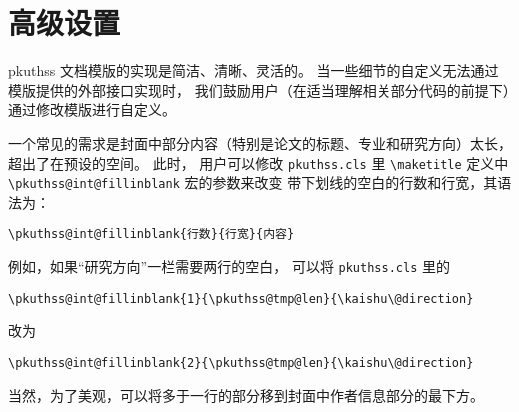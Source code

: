 	\section{高级设置}\label{sec:advanced}

	pkuthss 文档模版的实现是简洁、清晰、灵活的。
	当一些细节的自定义无法通过模版提供的外部接口实现时，
	我们鼓励用户（在适当理解相关部分代码的前提下）通过修改模版进行自定义。

	一个常见的需求是封面中部分内容（特别是论文的标题、专业和研究方向）太长，
	超出了在预设的空间。
	此时，
	用户可以修改 \verb|pkuthss.cls| 里 \verb|\maketitle| 定义中
	\verb|\pkuthss@int@fillinblank| 宏的参数来改变
	带下划线的空白的行数和行宽，其语法为：
\begin{Verbatim}[frame = single]
\pkuthss@int@fillinblank{行数}{行宽}{内容}
\end{Verbatim}
	例如，如果“研究方向”一栏需要两行的空白，
	可以将 \verb|pkuthss.cls| 里的
\begin{Verbatim}[frame = single]
\pkuthss@int@fillinblank{1}{\pkuthss@tmp@len}{\kaishu\@direction}
\end{Verbatim}
	改为
\begin{Verbatim}[frame = single]
\pkuthss@int@fillinblank{2}{\pkuthss@tmp@len}{\kaishu\@direction}
\end{Verbatim}
	当然，为了美观，可以将多于一行的部分移到封面中作者信息部分的最下方。

